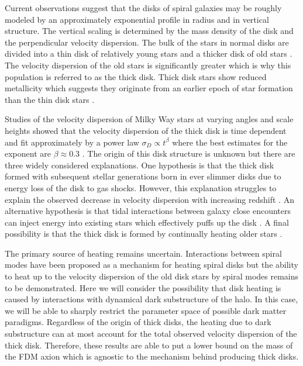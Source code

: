 \documentclass[usenatbib]{mnras}
\begin{document}
\hspace{5mm} Current observations suggest that the disks of spiral galaxies may be roughly modeled by an approximately exponential profile in radius and in vertical structure. The vertical scaling is determined by the mass density of the disk and the perpendicular velocity dispersion.  The bulk of the stars in normal disks are divided into a thin disk of relatively young stars and a thicker disk of old stars \citep{binney_tremaine_2008}.  The velocity dispersion of the old stars is significantly greater which is why this population is referred to as the thick disk. Thick disk stars show reduced metallicity which suggests they originate from an earlier epoch of star formation than the thin disk stars \citep{binney_tremaine_2008}. 
\par
Studies of the velocity dispersion of Milky Way stars at varying angles and scale heights showed that the velocity dispersion of the thick disk is time dependent and fit approximately by a power law $\sigma_D \propto t^{\beta}$ where the best estimates for the exponent are $\beta \approx 0.3$ \citep{heating_history}. The origin of this disk structure is unknown but there are three widely considered explanations. One hypothesis is that the thick disk formed with subsequent stellar generations born in ever slimmer disks due to energy loss of the disk to gas shocks. However, this explanation struggles to explain the observed decrease in velocity dispersion with increasing redshift \citep{emergence-thick-disk}. An alternative hypothesis is that tidal interactions between galaxy close encounters can inject energy into existing stars which effectively puffs up the disk \citep{thick-disk-mergers}. A final possibility is that the thick disk is formed by continually heating older stars \citep{thin-and-thick-disk}. 
\par 
The primary source of heating remains uncertain. Interactions between spiral modes have been proposed as a mechanism for heating spiral disks but the ability to heat up to the velocity dispersion of the old disk stars by spiral modes remains to be demonstrated. Here we will consider the possibility that disk heating is caused by interactions with dynamical dark substructure of the halo. In this case, we will be able to sharply restrict the parameter space of possible dark matter paradigms. Regardless of the origin of thick disks, the heating due to dark substructure can at most account for the total observed velocity dispersion of the thick disk. Therefore, these results are able to put a lower bound on the mass of the FDM axion which is agnostic to the mechanism behind producing thick disks.
\end{document}
